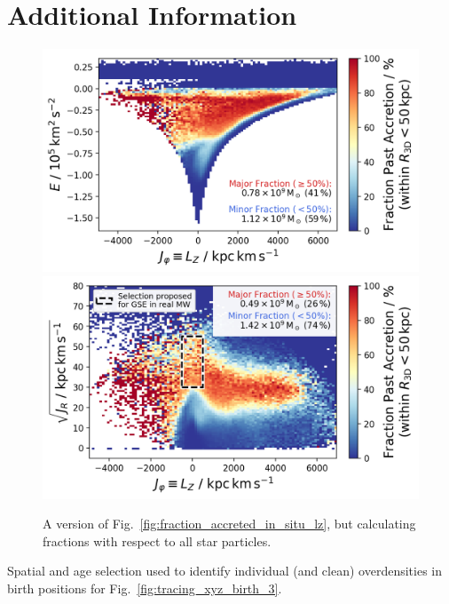 \documentclass[fleqn,usenatbib]{mnras}
\begin{document}
\section{Additional Information}

\begin{figure}
    \centering
    \includegraphics[width=\columnwidth]{figures/fraction_accreted_in_situ_lz_e_total.png}
    \includegraphics[width=\columnwidth]{figures/fraction_accreted_in_situ_lz_jr_total.png}
    \caption{A version of Fig.~\ref{fig:fraction_accreted_in_situ_lz}, but calculating fractions with respect to all star particles.}
    \label{fig:fraction_accreted_in_situ_lz_total}
\end{figure}

\begin{table}
    \centering
    \caption{Spatial and age selection used to identify individual (and clean) overdensities in birth positions for Fig.~\ref{fig:tracing_xyz_birth_3}.}
    
    \label{tab:birth_position_tabular}
\end{table}
\end{document}
